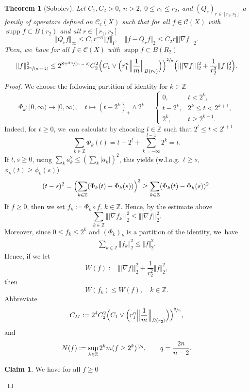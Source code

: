 \documentclass[JEP,XML,SOM,Unicode,published]{cedram}
\newcommand{\spfrac}[2]{\sfrac{#1}{(#2)}}
\theoremstyle{plain}
\newtheorem{theorem}{Theorem}[section]
\theoremstyle{definition}
\newtheorem*{claim}{Claim}
\newcommand{\ZZ}{\mathbb{Z}}
\newcommand{\cC}{\mathcal{C}}
\DeclareMathOperator{\supp}{supp}
\begin{document}
\begin{theorem}[Sobolev]\label{thm:SobM}
Let $C_1,C_2>0$, $n>2$, $0\leq r_1\leq r_2$,
and $(Q_r)_{r\in[r_1,r_2]}$ a family of operators defined on $\cC_c(X)$ such that for all $f\in\cC(X)$ with $\supp f\subset B(r_2)$ and all $r\in [r_1,r_2]$
\[
\Vert Q_rf\Vert_\infty\leq C_1 r^{-n}\Vert f\Vert_1, \quad \Vert f-Q_rf\Vert_2\leq C_2 r\Vert| \nabla f|\Vert_2.
\]
Then, we~have for all $f\in\cC(X)$ with $\supp f\subset B(R_2)$
\begin{align*}
\Vert f\Vert_{\spfrac{2n}{n-2}}^2
\leq 2^{8+\spfrac{2n}{n-2}}C_2^2
\Bigl(C_1\vee \Bigl(r_1^n\Bigl\Vert\frac1m\Bigr\Vert_{B(r_2)} \Bigr) \Bigr)^{\sfrac{2}{n}}
\Bigl(
\Vert |\nabla f|\Vert_2^2+\frac{1}{r_2^2}\Vert f\Vert_2^2 \Bigr).
\end{align*}
\end{theorem}
\begin{proof}
We choose the following partition of identity for $ k\in \mathbb{Z} $
\[
\Phi_k\colon [0,\infty)\to[0,\infty),\quad t\longmapsto (t-2^k)_+\wedge 2^k
=
\begin{cases}
0,& t<2^k,\\
t-2^k, &2^k\leq t<2^{k+1},\\
2^k,& t\geq 2^{k+1}.
\end{cases}
\]
Indeed, for $t\geq 0$, we~can calculate by choosing $l\in \ZZ$ such that $2^l\leq t<2^{l+1}$
\[
\sum_{k\in \mathbb{Z}}\Phi_k(t)=t-2^l+\sum_{k=-\infty}^{l-1}2^k=t.
\]
If $t,s\geq0$, using $\sum_k a_k^2\leq (\sum_k \vert a_k\vert)^2$, this yields (w.l.o.g.~$t\geq s$, \ie $ \phi_{k}(t)\ge \phi_{k}(s) $)
\[
(t-s)^2= \Bigl(\sum_{k\in \mathbb{Z}}(\Phi_k(t)-\Phi_k(s)) \Bigr)^2
\geq \sum_{k\in \mathbb{Z}}(\Phi_k(t)-\Phi_k(s))^2.
\]
If $f\ge 0$, then we set $f_k:=\Phi_k\circ f$, $k\in \ZZ$. Hence, by the estimate above
\[
\sum_{k\in \mathbb{Z}}\Vert \vert \nabla f_k\vert\Vert_2^2\leq \Vert \vert \nabla f\vert\Vert_2^2.
\]
Moreover,
since $0\leq f_k\leq 2^k$ and $(\Phi_k)_k$ is a partition of the identity, we~have
\begin{align*}
\sum_{k\in \mathbb{Z}} \Vert f_k\Vert_2^2
\leq \Vert f\Vert_2^2.
\end{align*}
Hence, if we let
\[
W(f):=\Vert| \nabla f|\Vert_2^2+\frac{1}{r_2^2}\Vert f\Vert_2^2,
\]
then
\[
W(f_k)
\leq W(f), \quad k\in\ZZ.
\]
Abbreviate
\[
C_M:=2^{4}C_2^2
\Bigl(C_1\vee \Bigl(r_1^n \Bigl\Vert\frac1m \Bigr\Vert_{B(r_2)} \Bigr) \Bigr)^{\sfrac{2}{n}},
\]
and
\[
N(f):=\sup_{k\in\ZZ} 2^k m(f\geq 2^k)^{\sfrac{1}{q}}, \qquad q=\frac{2n}{n-2}.
\]
\begin{claim}We have {for all $ f\ge 0 $}

\end{claim}
\end{proof}
\end{document}
